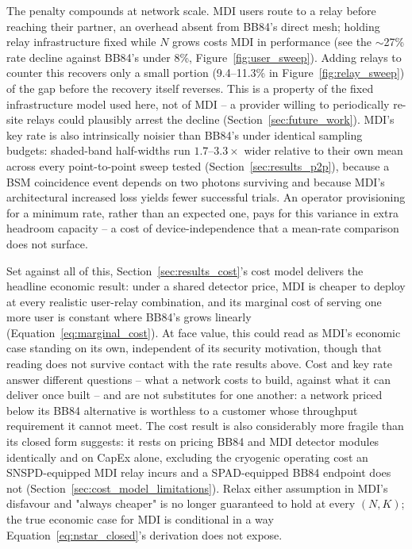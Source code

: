 \documentclass[12pt]{article}
\begin{document}
The penalty compounds at network scale. MDI users route to a relay before reaching their partner, an overhead absent from BB84's direct mesh; holding relay infrastructure fixed while $N$ grows costs MDI in performance (see the $\sim$27\% rate decline against BB84's under 8\%, Figure~\ref{fig:user_sweep}). Adding relays to counter this recovers only a small portion (9.4--11.3\% in Figure~\ref{fig:relay_sweep}) of the gap before the recovery itself reverses. This is a property of the fixed infrastructure model used here, not of MDI -- a provider willing to periodically re-site relays could plausibly arrest the decline (Section~\ref{sec:future_work}). MDI's key rate is also intrinsically noisier than BB84's under identical sampling budgets: shaded-band half-widths run $1.7$--$3.3\times$ wider relative to their own mean across every point-to-point sweep tested (Section~\ref{sec:results_p2p}), because a BSM coincidence event depends on two photons surviving and because MDI's architectural increased loss yields fewer successful trials. An operator provisioning for a minimum rate, rather than an expected one, pays for this variance in extra headroom capacity -- a cost of device-independence that a mean-rate comparison does not surface.

Set against all of this, Section~\ref{sec:results_cost}'s cost model delivers the headline economic result: under a shared detector price, MDI is cheaper to deploy at every realistic user-relay combination, and its marginal cost of serving one more user is constant where BB84's grows linearly (Equation~\ref{eq:marginal_cost}). At face value, this could read as MDI's economic case standing on its own, independent of its security motivation, though that reading does not survive contact with the rate results above. Cost and key rate answer different questions -- what a network costs to build, against what it can deliver once built -- and are not substitutes for one another: a network priced below its BB84 alternative is worthless to a customer whose throughput requirement it cannot meet. The cost result is also considerably more fragile than its closed form suggests: it rests on pricing BB84 and MDI detector modules identically and on CapEx alone, excluding the cryogenic operating cost an SNSPD-equipped MDI relay incurs and a SPAD-equipped BB84 endpoint does not (Section~\ref{sec:cost_model_limitations}). Relax either assumption in MDI's disfavour and "always cheaper" is no longer guaranteed to hold at every $(N,K)$; the true economic case for MDI is conditional in a way Equation~\ref{eq:nstar_closed}'s derivation does not expose.
\end{document}
